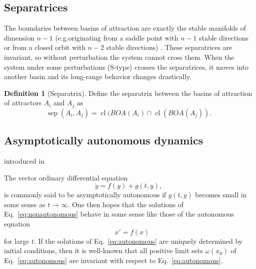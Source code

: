 \documentclass{article}
\theoremstyle{definition} \newtheorem{definition}{Definition}
\theoremstyle{remark} \newtheorem{remark}{Remark}
\newcommand{\sep}{\operatorname{sep}}
\newcommand{\cl}{\operatorname{cl}}
\newcounter{ct}
\begin{document}
\subsection{Separatrices}\label{sec:sep}
The boundaries between basins of attraction are exactly the stable manifolds of dimension $n-1$ (e.g.originating from a saddle point with $n-1$ stable directions 
or from a closed orbit with $n-2$ stable directions) \citep{gruemm1975stable}.
These separatrices are invariant, so without  perturbation the system cannot cross them.
When the system under some perturbations (S-type) crosses the separatrices, it moves into another basin and its long-range behavior changes drastically.

\begin{definition}[Separatrix]\label{def:separatrix}
Define the separatrix between the basins of attraction of attractors $A_i$ and $A_j$ as 
\begin{equation}
\sep(A_i,A_j) = \cl(BOA(A_i)\cap \cl(BOA(A_j)).
\end{equation}
\end{definition}











\subsection{Asymptotically autonomous dynamics}\label{sec:asyauto}
introduced in \citep{markus1956asyauto}

The vector ordinary differential equation  
\begin{equation}\label{eq:nonautonomous}
 \dot y = f(y) + g(t, y),
\end{equation}
is commonly said to be asymptotically autonomous if \( g(t, y) \) becomes small in some sense as \( t \to \infty \). One then hopes that the solutions of Eq.~\ref{eq:nonautonomous} behave in some sense like those of the autonomous equation  
\begin{equation}\label{eq:autonomous}
\quad x' = f(x)
\end{equation}
for large \( t \). If the solutions of Eq.~\ref{eq:autonomous} are uniquely determined by initial conditions,   then it is well-known \cite{} that all positive limit sets \( \omega(x_0) \) of Eq.~\ref{eq:autonomous} are invariant with respect to Eq.~\ref{eq:autonomous}.
\end{document}
